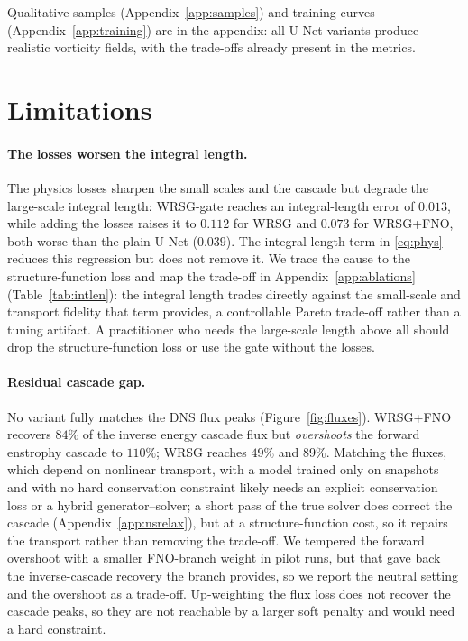 \documentclass[10pt]{article} %
\begin{document}
Qualitative samples (Appendix~\ref{app:samples}) and training curves (Appendix~\ref{app:training}) are in the appendix: all U-Net variants produce realistic vorticity fields, with the trade-offs already present in the metrics.

\section{Limitations}
\label{sec:limitations}

\paragraph{The losses worsen the integral length.} The physics losses sharpen the small scales and the cascade but degrade the large-scale integral length: WRSG-gate reaches an integral-length error of $0.013$, while adding the losses raises it to $0.112$ for WRSG and $0.073$ for WRSG+FNO, both worse than the plain U-Net ($0.039$). The integral-length term in \eqref{eq:phys} reduces this regression but does not remove it. We trace the cause to the structure-function loss and map the trade-off in Appendix~\ref{app:ablations} (Table~\ref{tab:intlen}): the integral length trades directly against the small-scale and transport fidelity that term provides, a controllable Pareto trade-off rather than a tuning artifact. A practitioner who needs the large-scale length above all should drop the structure-function loss or use the gate without the losses.

\paragraph{Residual cascade gap.} No variant fully matches the DNS flux peaks (Figure~\ref{fig:fluxes}). WRSG+FNO recovers $84\%$ of the inverse energy cascade flux but \emph{overshoots} the forward enstrophy cascade to $110\%$; WRSG reaches $49\%$ and $89\%$. Matching the fluxes, which depend on nonlinear transport, with a model trained only on snapshots and with no hard conservation constraint likely needs an explicit conservation loss or a hybrid generator--solver; a short pass of the true solver does correct the cascade (Appendix~\ref{app:nsrelax}), but at a structure-function cost, so it repairs the transport rather than removing the trade-off. We tempered the forward overshoot with a smaller FNO-branch weight in pilot runs, but that gave back the inverse-cascade recovery the branch provides, so we report the neutral setting and the overshoot as a trade-off. Up-weighting the flux loss does not recover the cascade peaks, so they are not reachable by a larger soft penalty and would need a hard constraint.
\end{document}
